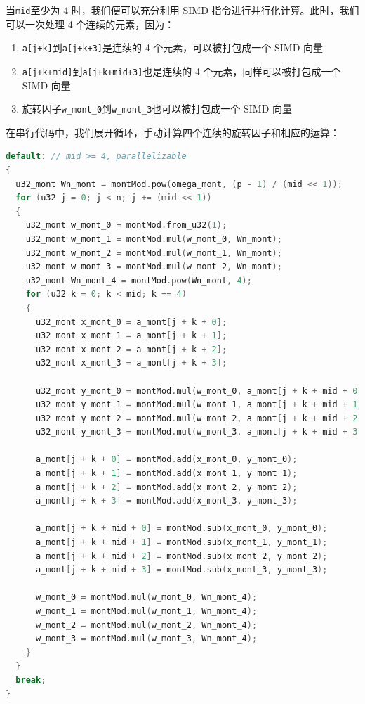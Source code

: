 \documentclass[a4paper]{article}
\begin{document}
当\texttt{mid}至少为 4 时，我们便可以充分利用 SIMD 指令进行并行化计算。此时，我们可以一次处理 4 个连续的元素，因为：

\begin{enumerate}
    \item \texttt{a[j+k]}到\texttt{a[j+k+3]}是连续的 4 个元素，可以被打包成一个 SIMD 向量
    \item \texttt{a[j+k+mid]}到\texttt{a[j+k+mid+3]}也是连续的 4 个元素，同样可以被打包成一个 SIMD 向量
    \item 旋转因子\texttt{w\_mont\_0}到\texttt{w\_mont\_3}也可以被打包成一个 SIMD 向量
\end{enumerate}

在串行代码中，我们展开循环，手动计算四个连续的旋转因子和相应的运算：

\begin{lstlisting}[language=C++]
default: // mid >= 4, parallelizable
{
  u32_mont Wn_mont = montMod.pow(omega_mont, (p - 1) / (mid << 1));
  for (u32 j = 0; j < n; j += (mid << 1))
  {
    u32_mont w_mont_0 = montMod.from_u32(1);
    u32_mont w_mont_1 = montMod.mul(w_mont_0, Wn_mont);
    u32_mont w_mont_2 = montMod.mul(w_mont_1, Wn_mont);
    u32_mont w_mont_3 = montMod.mul(w_mont_2, Wn_mont);
    u32_mont Wn_mont_4 = montMod.pow(Wn_mont, 4);
    for (u32 k = 0; k < mid; k += 4)
    {
      u32_mont x_mont_0 = a_mont[j + k + 0];
      u32_mont x_mont_1 = a_mont[j + k + 1];
      u32_mont x_mont_2 = a_mont[j + k + 2];
      u32_mont x_mont_3 = a_mont[j + k + 3];

      u32_mont y_mont_0 = montMod.mul(w_mont_0, a_mont[j + k + mid + 0]);
      u32_mont y_mont_1 = montMod.mul(w_mont_1, a_mont[j + k + mid + 1]);
      u32_mont y_mont_2 = montMod.mul(w_mont_2, a_mont[j + k + mid + 2]);
      u32_mont y_mont_3 = montMod.mul(w_mont_3, a_mont[j + k + mid + 3]);

      a_mont[j + k + 0] = montMod.add(x_mont_0, y_mont_0);
      a_mont[j + k + 1] = montMod.add(x_mont_1, y_mont_1);
      a_mont[j + k + 2] = montMod.add(x_mont_2, y_mont_2);
      a_mont[j + k + 3] = montMod.add(x_mont_3, y_mont_3);

      a_mont[j + k + mid + 0] = montMod.sub(x_mont_0, y_mont_0);
      a_mont[j + k + mid + 1] = montMod.sub(x_mont_1, y_mont_1);
      a_mont[j + k + mid + 2] = montMod.sub(x_mont_2, y_mont_2);
      a_mont[j + k + mid + 3] = montMod.sub(x_mont_3, y_mont_3);

      w_mont_0 = montMod.mul(w_mont_0, Wn_mont_4);
      w_mont_1 = montMod.mul(w_mont_1, Wn_mont_4);
      w_mont_2 = montMod.mul(w_mont_2, Wn_mont_4);
      w_mont_3 = montMod.mul(w_mont_3, Wn_mont_4);
    }
  }
  break;
}
\end{lstlisting}
\end{document}
